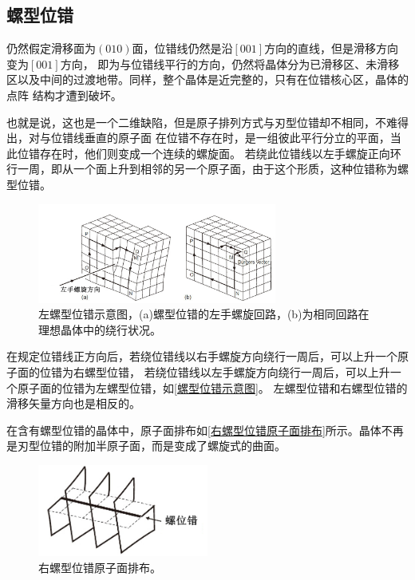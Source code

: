             \subsection{螺型位错}
                仍然假定滑移面为$\left( 010 \right)$面，位错线仍然是沿$[001]$方向的直线，但是滑移方向变为$[001]$方向，
                即为与位错线平行的方向，仍然将晶体分为已滑移区、未滑移区以及中间的过渡地带。同样，整个晶体是近完整的，只有在位错核心区，晶体的点阵
                结构才遭到破坏。
                
                也就是说，这也是一个二维缺陷，但是原子排列方式与刃型位错却不相同，不难得出，对与位错线垂直的原子面
                在位错不存在时，是一组彼此平行分立的平面，当此位错存在时，他们则变成一个连续的螺旋面。
                若绕此位错线以左手螺旋正向环行一周，即从一个面上升到相邻的另一个原子面，由于这个形质，这种位错称为螺型位错。
                
                \begin{figure}[ht]
                    \centering
                    \includegraphics[width=0.7\textwidth]{fig/螺型位错示意图.jpg}
                    \caption{左螺型位错示意图，(a)螺型位错的左手螺旋回路，(b)为相同回路在理想晶体中的绕行状况。}
                    \label{螺型位错示意图}
                \end{figure}

                在规定位错线正方向后，若绕位错线以右手螺旋方向绕行一周后，可以上升一个原子面的位错为右螺型位错，
                若绕位错线以左手螺旋方向绕行一周后，可以上升一个原子面的位错为左螺型位错，如\autoref{螺型位错示意图}。
                左螺型位错和右螺型位错的滑移矢量方向也是相反的。

                在含有螺型位错的晶体中，原子面排布如\autoref{右螺型位错原子面排布}所示。晶体不再是刃型位错的附加半原子面，而是变成了螺旋式的曲面。
                \begin{figure}[ht]
                    \centering
                    \includegraphics[width=0.5\textwidth]{fig/螺位错原子面排布.jpg}
                    \caption{右螺型位错原子面排布。}
                    \label{右螺型位错原子面排布}
                \end{figure}
